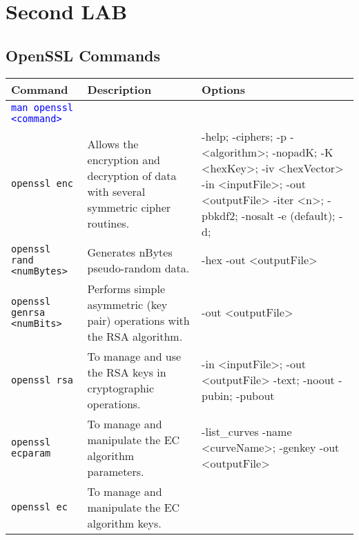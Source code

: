 \section{Second LAB}
\cite{LAB2}


\subsection{OpenSSL Commands}

\begin{table}[H]
	\centering
    \begin{tabular}{|p{6cm}|p{3cm}|p{7cm}|}\hline
        \rowcolor{gray!30}
		\textbf{Command} & \textbf{Description} & \textbf{Options} \\ \hline
		\textcolor{Blue}{\texttt{man openssl <command>}} 
			& 
			& 
			\\ \hline
        \texttt{openssl enc} 
			& Allows the encryption and decryption of data with several symmetric cipher
        routines. 
			& -help; -ciphers; -p
				\newline -<algorithm>; -nopadK;
				\newline -K <hexKey>; -iv <hexVector>
				\newline -in <inputFile>; -out <outputFile>
				\newline -iter <n>; -pbkdf2; -nosalt
				\newline -e (default); -d; 
				\\ \hline
        \texttt{openssl rand <numBytes>} 
			& Generates nBytes pseudo-random data.
			& -hex
				\newline -out <outputFile>
			\\ \hline
        \texttt{openssl genrsa <numBits>} 
			& Performs simple asymmetric (key pair) operations with the RSA algorithm.
			& -out <outputFile>
			\\ \hline
		\texttt{openssl rsa} 
			& To manage and use the RSA keys in cryptographic operations.
			& -in <inputFile>; -out <outputFile>
				\newline -text; -noout
				\newline -pubin; -pubout
			\\ \hline
		\texttt{openssl ecparam} 
			& To manage and manipulate the EC algorithm parameters.
			& -list\_curves
				\newline -name <curveName>; -genkey
				\newline -out <outputFile>
			\\ \hline
		\texttt{openssl ec} 
			& To manage and manipulate the EC algorithm keys.

\end{tabular}
\end{table}
